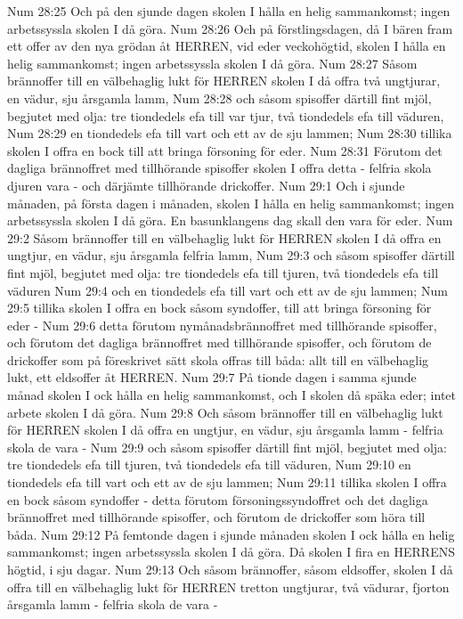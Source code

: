 Num 28:25  Och på den sjunde dagen skolen I hålla en helig sammankomst; ingen arbetssyssla skolen I då göra.
Num 28:26  Och på förstlingsdagen, då I bären fram ett offer av den nya grödan åt HERREN, vid eder veckohögtid, skolen I hålla en helig sammankomst; ingen arbetssyssla skolen I då göra.
Num 28:27  Såsom brännoffer till en välbehaglig lukt för HERREN skolen I då offra två ungtjurar, en vädur, sju årsgamla lamm,
Num 28:28  och såsom spisoffer därtill fint mjöl, begjutet med olja: tre tiondedels efa till var tjur, två tiondedels efa till väduren,
Num 28:29  en tiondedels efa till vart och ett av de sju lammen;
Num 28:30  tillika skolen I offra en bock till att bringa försoning för eder.
Num 28:31  Förutom det dagliga brännoffret med tillhörande spisoffer skolen I offra detta - felfria skola djuren vara - och därjämte tillhörande drickoffer.
Num 29:1  Och i sjunde månaden, på första dagen i månaden, skolen I hålla en helig sammankomst; ingen arbetssyssla skolen I då göra. En basunklangens dag skall den vara för eder.
Num 29:2  Såsom brännoffer till en välbehaglig lukt för HERREN skolen I då offra en ungtjur, en vädur, sju årsgamla felfria lamm,
Num 29:3  och såsom spisoffer därtill fint mjöl, begjutet med olja: tre tiondedels efa till tjuren, två tiondedels efa till väduren
Num 29:4  och en tiondedels efa till vart och ett av de sju lammen;
Num 29:5  tillika skolen I offra en bock såsom syndoffer, till att bringa försoning för eder -
Num 29:6  detta förutom nymånadsbrännoffret med tillhörande spisoffer, och förutom det dagliga brännoffret med tillhörande spisoffer, och förutom de drickoffer som på föreskrivet sätt skola offras till båda: allt till en välbehaglig lukt, ett eldsoffer åt HERREN.
Num 29:7  På tionde dagen i samma sjunde månad skolen I ock hålla en helig sammankomst, och I skolen då späka eder; intet arbete skolen I då göra.
Num 29:8  Och såsom brännoffer till en välbehaglig lukt för HERREN skolen I då offra en ungtjur, en vädur, sju årsgamla lamm - felfria skola de vara -
Num 29:9  och såsom spisoffer därtill fint mjöl, begjutet med olja: tre tiondedels efa till tjuren, två tiondedels efa till väduren,
Num 29:10  en tiondedels efa till vart och ett av de sju lammen;
Num 29:11  tillika skolen I offra en bock såsom syndoffer - detta förutom försoningssyndoffret och det dagliga brännoffret med tillhörande spisoffer, och förutom de drickoffer som höra till båda.
Num 29:12  På femtonde dagen i sjunde månaden skolen I ock hålla en helig sammankomst; ingen arbetssyssla skolen I då göra. Då skolen I fira en HERRENS högtid, i sju dagar.
Num 29:13  Och såsom brännoffer, såsom eldsoffer, skolen I då offra till en välbehaglig lukt för HERREN tretton ungtjurar, två vädurar, fjorton årsgamla lamm - felfria skola de vara -
